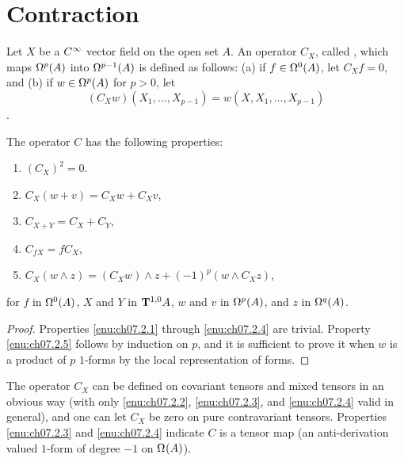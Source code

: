 \documentclass[../main]{sub+files}
\begin{document}
\section{Contraction}\label{ch07:s2}
Let $X$ be a $\CInfty$ vector field on the open set $A$. An operator $C_X$, called , which maps $\formbundle{A}{p}$ into $\formbundle{A}{{p - 1}}$ is defined as follows: (a) if $f \in \formbundle{A}{0}$, let $C_X f = 0$, and (b) if $w \in \formbundle{A}{p}$ for $p > 0$, let \[(C_X w) (X_1, \ldots, X_{p - 1}) = w (X, X_1, \ldots, X_{p - 1})\].



\begin{proposition} \label{prop:ch7.2.1}
The operator $C$ has the following properties:

\begin{enumerate}[label=(\arabic*)]
	\item $(C_X)^2 = 0$. \label{enu:ch07.2.1}
	\item $C_X(w + v) = C_X w + C_X v$,\label{enu:ch07.2.2}
	\item $C_{X + Y} = C_X + C_Y$,\label{enu:ch07.2.3}
	\item $C_{f X} = f C_X$,\label{enu:ch07.2.4}
	\item $C_X(w \wedge z) = (C_X w) \wedge z + (-1)^p (w \wedge C_X z)$,\label{enu:ch07.2.5}
\end{enumerate}

for $f$ in $\formbundle{A}{0}$, $X$ and $Y$ in $\tensorbundle{A}{1}{0}$, $w$ and $v$ in $\formbundle{A}{p}$, and $z$ in $\formbundle{A}{q}$.
\end{proposition}

\begin{proof}
Properties \ref{enu:ch07.2.1} through \ref{enu:ch07.2.4} are trivial. Property \ref{enu:ch07.2.5} follows by induction on $p$, and it is sufficient to prove it when $w$ is a product of $p$ $1$-forms by the local representation of forms.
\end{proof}



The operator $C_X$ can be defined on covariant tensors and mixed tensors in an obvious way (with only \ref{enu:ch07.2.2}, \ref{enu:ch07.2.3}, and \ref{enu:ch07.2.4} valid in general), and one can let $C_X$ be zero on pure contravariant tensors. Properties \ref{enu:ch07.2.3} and \ref{enu:ch07.2.4} indicate $C$ is a tensor map (an anti-derivation valued $1$-form of degree $-1$ on $\formbundle{A}{}$).
\end{document}
